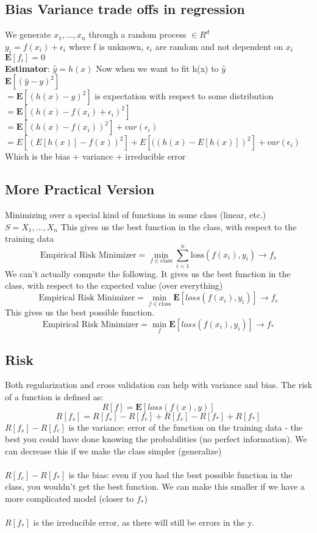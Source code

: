 \documentclass{article}
\begin{document}
\subsection{Bias Variance trade offs in regression}
We generate $x_1,..., x_n$ through a random process $\in R^d$ \\
$y_i = f(x_i) + \epsilon_i$ where f is unknown, $\epsilon_i$ are random and not dependent on $x_i$ $\mathbf{E}[f_i] = 0$ \\
\textbf{Estimator}: $\hat{y} = h(x)$
Now when we want to fit h(x) to $\hat{y}$ \\
$\mathbf{E}[(\hat{y} - y)^2]$ \\
$=\mathbf{E}[(h(x) - y)^2]$ is expectation with respect to some distribution \\
$=\mathbf{E}[(h(x) - f(x_i) + \epsilon_i)^2]$ \\
$=\mathbf{E}[(h(x) - f(x_i))^2] + var(\epsilon_i)$ \\
$=E[(E[h(x)]-f(x))^2] + E[((h(x) - E[h(x)])^2] + var(\epsilon_i)$ \\
Which is the bias + variance + irreducible error
\subsection{More Practical Version}
Minimizing over a special kind of functions in some class (linear, etc.) $S = {X_1,...,X_n}$
This gives us the best function in the class, with respect to the training data
$$\textrm{Empirical Risk Minimizer} = \min_{f \in \textrm{class}} \sum_{i=1}^n \textrm{loss} (f(x_i),y_i) \rightarrow f_s$$
We can't actually compute the following. It gives us the best function in the class, with respect to the expected value (over everything)
$$\textrm{Empirical Risk Minimizer} = \min_{f \in \textrm{class}} \mathbf{E}[loss(f(x_i), y_i)]\rightarrow f_c$$
This gives us the best possible function.
$$\textrm{Empirical Risk Minimizer} = \min_{f} \mathbf{E}[loss(f(x_i), y_i)]\rightarrow f_*$$
\subsection{Risk}
Both regularization and cross validation can help with variance and bias. The risk of a function is defined as:
$$R[f] = \mathbf{E}[loss(f(x),y)]$$
$$R[f_s] = R[f_s] - R[f_c] + R[f_c] - R[f_*] + R[f_*]$$
$R[f_s] - R[f_c]$ is the variance: error of the function on the training data - the best you could have done knowing the probabilities (no perfect information). We can decrease this if we make the class simpler (generalize) \\ \\
$R[f_c] - R[f_*]$ is the bias: even if you had the best possible function in the class, you wouldn't get the best function. We can make this smaller if we have a more complicated model (closer to $f_*$) \\ \\
$R[f_*]$ is the irreducible error, as there will still be errors in the y. 
\end{document}
